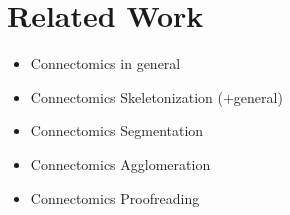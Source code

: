 \section{Related Work}

\begin{itemize}
	\item Connectomics in general
	\item Connectomics Skeletonization (+general)
	\item Connectomics Segmentation
	\item Connectomics Agglomeration
	\item Connectomics Proofreading
\end{itemize}
